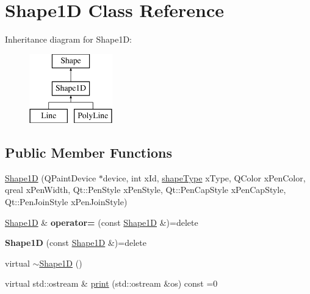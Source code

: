 \hypertarget{classShape1D}{\section{Shape1\-D Class Reference}
\label{classShape1D}
}
Inheritance diagram for Shape1\-D\-:\begin{figure}[H]
\begin{center}
\leavevmode
\includegraphics[height=3.000000cm]{classShape1D}
\end{center}
\end{figure}
\subsection*{Public Member Functions}
\begin{DoxyCompactItemize}
\item 
\hyperlink{classShape1D_a2dd4df43f1a9c8530e5346465f638011}{Shape1\-D} (Q\-Paint\-Device $\ast$device, int x\-Id, \hyperlink{classShape_aaac58aa2f6760d0f06ec1710d5123e9b}{shape\-Type} x\-Type, Q\-Color x\-Pen\-Color, qreal x\-Pen\-Width, Qt\-::\-Pen\-Style x\-Pen\-Style, Qt\-::\-Pen\-Cap\-Style x\-Pen\-Cap\-Style, Qt\-::\-Pen\-Join\-Style x\-Pen\-Join\-Style)
\item 
\hypertarget{classShape1D_a58711e617f2cbc92b5732586f0ff96b8}{\hyperlink{classShape1D}{Shape1\-D} \& {\bfseries operator=} (const \hyperlink{classShape1D}{Shape1\-D} \&)=delete}\label{classShape1D_a58711e617f2cbc92b5732586f0ff96b8}

\item 
\hypertarget{classShape1D_ad0be726f3444d3d76484ce9afa3c8214}{{\bfseries Shape1\-D} (const \hyperlink{classShape1D}{Shape1\-D} \&)=delete}\label{classShape1D_ad0be726f3444d3d76484ce9afa3c8214}

\item 
virtual \hyperlink{classShape1D_aef223c181450f2dd0f304072e2fa0382}{$\sim$\-Shape1\-D} ()
\item 
virtual std\-::ostream \& \hyperlink{classShape1D_a20b9358df369b7b0fc4a1cdae5070836}{print} (std\-::ostream \&os) const =0
\end{DoxyCompactItemize}
